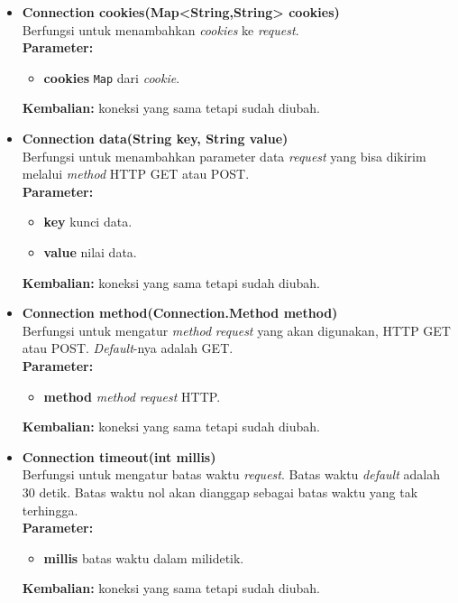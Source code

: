 \begin{itemize}
	\item \textbf{Connection cookies(Map<String,String> cookies)} \\
		Berfungsi untuk menambahkan \textit{cookies} ke \textit{request}. \\
		\textbf{Parameter:}
		\begin{itemize}
			\item \textbf{cookies} \texttt{Map} dari \textit{cookie}.
		\end{itemize}
		\textbf{Kembalian:} koneksi yang sama tetapi sudah diubah.
		
		\item \textbf{Connection data(String key, String value)} \\
		Berfungsi untuk menambahkan parameter data \textit{request} yang bisa dikirim melalui \textit{method} HTTP GET atau POST. \\
		\textbf{Parameter:}
		\begin{itemize}
			\item \textbf{key} kunci data.
			\item \textbf{value} nilai data.
		\end{itemize}
		\textbf{Kembalian:} koneksi yang sama tetapi sudah diubah.
		
		\item \textbf{Connection method(Connection.Method method)} \\
		Berfungsi untuk mengatur \textit{method} \textit{request} yang akan digunakan, HTTP GET atau POST. \textit{Default}-nya adalah GET.\\
		\textbf{Parameter:}
		\begin{itemize}
			\item \textbf{method} \textit{method} \textit{request} HTTP.
		\end{itemize}
		\textbf{Kembalian:} koneksi yang sama tetapi sudah diubah.
		
		\item \textbf{Connection timeout(int millis)} \\
		Berfungsi untuk mengatur batas waktu \textit{request}. Batas waktu \textit{default} adalah 30 detik. Batas waktu nol akan dianggap sebagai batas waktu yang tak terhingga. \\
		\textbf{Parameter:}
		\begin{itemize}
			\item \textbf{millis} batas waktu dalam milidetik.
		\end{itemize}
		\textbf{Kembalian:} koneksi yang sama tetapi sudah diubah.
		

\end{itemize}
